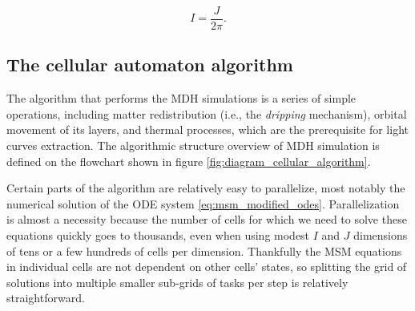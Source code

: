     \begin{equation}
        I = \frac{J}{2 \pi}.
        \label{eq:i_dimension} 
    \end{equation}

\subsection{The cellular automaton algorithm}
    The algorithm that performs the MDH simulations is a series of simple operations, including matter redistribution (i.e., the \emph{dripping} mechanism), orbital movement of its layers, and thermal processes, which are the prerequisite for light curves extraction. The algorithmic structure overview of MDH simulation is defined on the flowchart shown in figure \ref{fig:diagram_cellular_algorithm}. 

    Certain parts of the algorithm are relatively easy to parallelize, most notably the numerical solution of the ODE system \eqref{eq:msm_modified_odes}. Parallelization is almost a necessity because the number of cells for which we need to solve these equations quickly goes to thousands, even when using modest $I$ and $J$ dimensions of tens or a few hundreds of cells per dimension. Thankfully the MSM equations in individual cells are not dependent on other cells' states, so splitting the grid of solutions into multiple smaller sub-grids of tasks per step is relatively straightforward.

    \vspace*{2mm}
    
